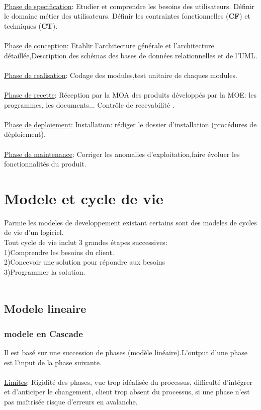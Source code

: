 \documentclass[a4paper,12pt,openany]{book}
\begin{document}
\\
\underline{Phase de specification}: Etudier et comprendre les besoins des utilisateurs. Définir le domaine métier des utilisateurs. Définir les contraintes fonctionnelles (\textbf{CF}) et techniques (\textbf{CT}).\\
\\
\underline{Phase de conception}: Etablir l’architecture générale et l’architecture détaillée,Description des schémas des bases de données relationnelles et de l'UML.\\
\\
\underline{Phase de realisation}: Codage des modules,test unitaire de chaques modules.\\
\\
\underline{Phase de recette}: Réception par la MOA des produits développés par la MOE: les programmes, les documents... Contrôle de recevabilité .\\
\\
\underline{Phase de deploiement}: Installation: rédiger le dossier d’installation (procédures de déploiement).\\
\\
\underline{Phase de maintenance}: Corriger les anomalies d’exploitation,faire évoluer les fonctionnalités du produit.\\




\newpage

\chapter{Modele et cycle de vie}

Parmie les modeles de developpement existant certains sont des modeles de cycles de vie d'un logiciel.\\

Tout cycle de vie inclut 3 grandes étapes successives: \\
1)Comprendre les besoins du client. \\
2)Concevoir une solution pour répondre aux besoins\\3)Programmer la solution.\\
\\
\section{Modele lineaire}
\subsection{modele en Cascade}
Il est basé sur une succession de phases (modèle linéaire).L'output d'une phase est l'input de la phase suivante.\\
\\
\underline{Limites}: Rigidité des phases, vue trop idéalisée du processus, difficulté d'intégrer et d'anticiper le changement, client trop absent du processus, si une phase n’est pas maîtrisée risque d’erreurs en avalanche.\\
\end{document}
